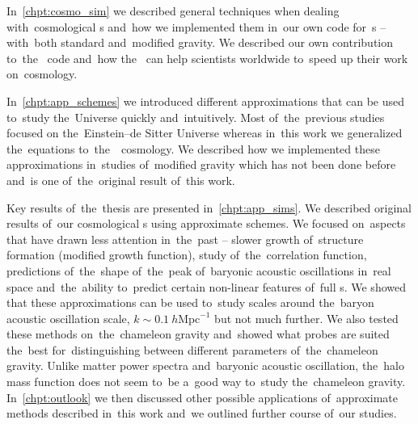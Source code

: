 In~\autoref{chpt:cosmo_sim} we described general techniques when dealing with~cosmological \nbodysim s and~how we implemented them in~our own code for~\nbodysim s -- with~both standard and~modified gravity. We described our own contribution to~the~ code and~how the~ can help scientists worldwide to~speed up their work on~cosmology.

In~\autoref{chpt:app_schemes} we introduced different approximations that can be used to~study the~Universe quickly and~intuitively. Most of~the~previous studies focused on the~Einstein--de Sitter Universe whereas in~this work we generalized the~equations to~the~\LCDM\ cosmology. We described how we implemented these approximations in~studies of~modified gravity which has not been done before and~is one of~the~original result of~this work.

Key results of~the~thesis are presented in~\autoref{chpt:app_sims}. We described original results of~our cosmological \nbodysim s using approximate schemes. We focused on~aspects that have drawn less attention in~the~past -- slower growth of~structure formation (modified growth function), study of~the~correlation function, predictions of~the~shape of~the~peak of~baryonic acoustic oscillations in~real space and~the~ability to~predict certain non-linear features of~full \nbodysim s. We showed that these approximations can be used to~study scales around the~baryon acoustic oscillation scale, $k\sim 0.1~h\text{Mpc}^{-1}$ but not much further. We also tested these methods on~the~chameleon gravity and~showed what probes are suited the~best for~distinguishing between different parameters of~the~chameleon gravity. Unlike matter power spectra and~baryonic acoustic oscillation, the~halo mass function does not seem to~be a~good way to~study the~chameleon gravity. In~\autoref{chpt:outlook} we then discussed other possible applications of~approximate methods described in~this work and~we outlined further course of~our studies.

